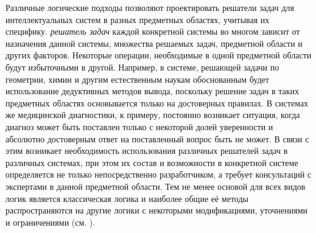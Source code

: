 Различные логические подходы позволяют проектировать решатели задач для интеллектуальных систем в разных предметных областях, учитывая их специфику. \textit{решатель задач} каждой конкретной системы во многом зависит от назначения данной системы, множества решаемых задач, предметной области и других факторов. Некоторые операции, необходимые в одной предметной области будут избыточными в другой. Например, в системе, решающей задачи по геометрии, химии и другим естественным наукам обоснованным будет использование дедуктивных методов вывода, поскольку решение задач в таких предметных областях основывается только на достоверных правилах. В системах же медицинской диагностики, к примеру, постоянно возникает ситуация, когда диагноз может быть поставлен только с некоторой долей уверенности и абсолютно достоверным ответ на поставленный вопрос быть не может. В связи с этим возникает необходимость использования различных решателей задач в различных системах, при этом их состав и возможности в конкретной системе определяется не только непосредственно разработчиком, а требует консультаций с экспертами в данной предметной области. Тем не менее основой для всех видов логик является классическая логика и наиболее общие её методы распространяются на другие логики с некоторыми модификациями, уточнениями и ограничениями (см. ).


